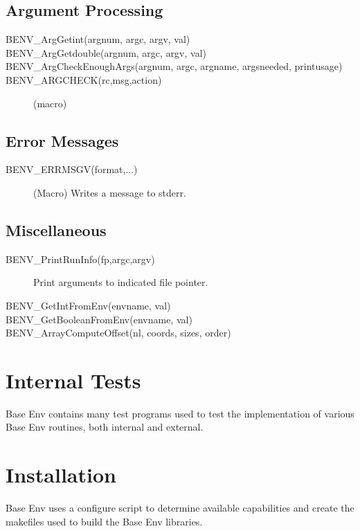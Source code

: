 \documentclass[11pt,letterpaper]{report}
\begin{document}
\section{Argument Processing}
\begin{description}
\item[BENV\_ArgGetint(argnum, argc, argv, val)]
\item[BENV\_ArgGetdouble(argnum, argc, argv, val)]
\item[BENV\_ArgCheckEnoughArgs(argnum, argc, argname, argsneeded,
  printusage)]
\item[BENV\_ARGCHECK(rc,msg,action)](macro)
\end{description}

\section{Error Messages}

\begin{description}
\item[BENV\_ERRMSGV(format,...)](Macro) Writes a message to stderr.
\end{description}

\section{Miscellaneous}

\begin{description}
\item[BENV\_PrintRunInfo(fp,argc,argv)]Print arguments to indicated
  file pointer.
\item[BENV\_GetIntFromEnv(envname, val)]
\item[BENV\_GetBooleanFromEnv(envname, val)]
\item[BENV\_ArrayComputeOffset(nl, coords, sizes, order)]
\end{description}

\chapter{Internal Tests}
Base Env contains many test programs used to test the implementation
of various Base Env routines, both internal and external.

\chapter{Installation}
Base Env uses a configure script to determine available capabilities
and create the makefiles used to build the Base Env libraries.
\end{document}
